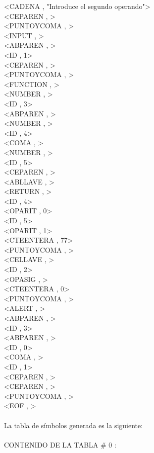 \documentclass{article}
\begin{document}
\begin{flushleft}
<CADENA , "Introduce el segundo operando">\\
<CEPAREN , >\\
<PUNTOYCOMA , >\\
<INPUT , >\\
<ABPAREN , >\\
<ID , 1>\\
<CEPAREN , >\\
<PUNTOYCOMA , >\\
<FUNCTION , >\\
<NUMBER , >\\
<ID , 3>\\
<ABPAREN , >\\
<NUMBER , >\\
<ID , 4>\\
<COMA , >\\
<NUMBER , >\\
<ID , 5>\\
<CEPAREN , >\\
<ABLLAVE , >\\
<RETURN , >\\
<ID , 4>\\
<OPARIT , 0>\\
<ID , 5>\\
<OPARIT , 1>\\
<CTEENTERA , 77>\\
<PUNTOYCOMA , >\\
<CELLAVE , >\\
<ID , 2>\\
<OPASIG , >\\
<CTEENTERA , 0>\\
<PUNTOYCOMA , >\\
<ALERT , >\\
<ABPAREN , >\\
<ID , 3>\\
<ABPAREN , >\\
<ID , 0>\\
<COMA , >\\
<ID , 1>\\
<CEPAREN , >\\
<CEPAREN , >\\
<PUNTOYCOMA , >\\
<EOF , >\\
\quad\\
La tabla de símbolos generada es la siguiente:\\
\quad\\
CONTENIDO DE LA TABLA \# 0 :\\


\end{flushleft}
\end{document}
